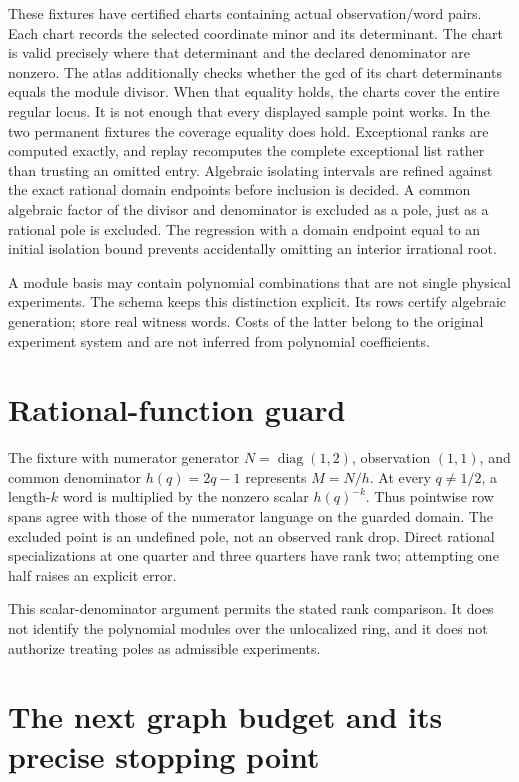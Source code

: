 \documentclass[
  11pt,
  a4paper,
]{report}
\let\singularitytexttt\texttt
\renewcommand{\texttt}[1]{\singularitytexttt{\seqsplit{#1}}}
\begin{document}
These fixtures have certified charts containing actual observation/word
pairs. Each chart records the selected coordinate minor and its
determinant. The chart is valid precisely where that determinant and the
declared denominator are nonzero. The atlas additionally checks whether
the gcd of its chart determinants equals the module divisor. When that
equality holds, the charts cover the entire regular locus. It is not
enough that every displayed sample point works. In the two permanent
fixtures the coverage equality does hold. Exceptional ranks are computed
exactly, and replay recomputes the complete exceptional list rather than
trusting an omitted entry. Algebraic isolating intervals are refined
against the exact rational domain endpoints before inclusion is decided.
A common algebraic factor of the divisor and denominator is excluded as
a pole, just as a rational pole is excluded. The regression with a
domain endpoint equal to an initial isolation bound prevents
accidentally omitting an interior irrational root.

A module basis may contain polynomial combinations that are not single
physical experiments. The schema keeps this distinction explicit. Its
\texttt{chain} rows certify algebraic generation; \texttt{charts} store
real witness words. Costs of the latter belong to the original
experiment system and are not inferred from polynomial coefficients.

\hypertarget{rational-function-guard}{%
\section{Rational-function guard}\label{rational-function-guard}}

The fixture with numerator generator \(N=\operatorname{diag}(1,2)\),
observation \((1,1)\), and common denominator \(h(q)=2q-1\) represents
\(M=N/h\). At every \(q\ne1/2\), a length-\(k\) word is multiplied by
the nonzero scalar \(h(q)^{-k}\). Thus pointwise row spans agree with
those of the numerator language on the guarded domain. The excluded
point is an undefined pole, not an observed rank drop. Direct rational
specializations at one quarter and three quarters have rank two;
attempting one half raises an explicit error.

This scalar-denominator argument permits the stated rank comparison. It
does not identify the polynomial modules over the unlocalized ring, and
it does not authorize treating poles as admissible experiments.

\hypertarget{the-next-graph-budget-and-its-precise-stopping-point}{%
\section{The next graph budget and its precise stopping
point}\label{the-next-graph-budget-and-its-precise-stopping-point}}
\end{document}
